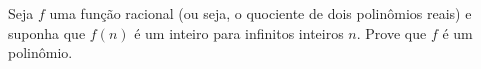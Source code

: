 Seja \( f \) uma função racional (ou seja, o quociente de dois polinômios reais) e suponha que \( f(n) \) é um inteiro para infinitos inteiros \( n \). Prove que \( f \) é um polinômio.
